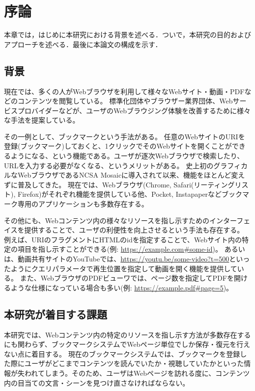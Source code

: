 \chapter{序論}
\label{chap:introduction}

本章では，はじめに本研究における背景を述べる．ついで，本研究の目的およびアプローチを述べる．最後に本論文の構成を示す．

\section{背景}
\label{section:background}

現在では、多くの人がWebブラウザを利用して様々なWebサイト・動画・PDFなどのコンテンツを閲覧している。
標準化団体やブラウザー業界団体、Webサービスプロバイダーなどが、ユーザのWebブラウジング体験を改善するために様々な手法を提案している。

その一例として、ブックマークという手法がある。
任意のWebサイトのURIを登録(ブックマーク)しておくと、1クリックでそのWebサイトを開くことができるようになる、という機能である。ユーザが逐次Webブラウザで検索したり、URLを入力する必要がなくなる、というメリットがある。
史上初のグラフィカルなWebブラウザであるNCSA Mosaic\cite{ncsa-mosaic}に導入されて以来、機能をほとんど変えずに普及してきた。
現在では、Webブラウザ(Chrome\cite{chrome}, Safari\cite{safari}(リーティングリスト), Firefox\cite{firefox})がそれぞれ機能を提供している他、Pocket\cite{pocket}, Instapaper\cite{instapaper}などブックマーク専用のアプリケーションも多数存在する。

その他にも、Webコンテンツ内の様々なリソースを指し示すためのインターフェイスを提供することで、ユーザの利便性を向上させるという手法も存在する。
例えば、URIのフラグメントにHTMLのidを指定することで、Webサイト内の特定の項目を指し示すことができる(例: \url{https://example.com#some-id})。
あるいは、動画共有サイトのYouTube\cite{youtube}では、\url{https://youtu.be/some-video?t=500}といったようにクエリパラメータで再生位置を指定して動画を開く機能を提供している。
また、WebブラウザのPDFビューワでは、ページ数を指定してPDFを開けるような仕様になっている場合も多い\cite{browser-pdf-viewer-pdf-page-num-function}(例: \url{https://example.pdf#page=5})。

\section{本研究が着目する課題}
本研究では、Webコンテンツ内の特定のリソースを指し示す方法が多数存在するにも関わらず、ブックマークシステムでWebページ単位でしか保存・復元を行えない点に着目する。
現在のブックマークシステムでは、ブックマークを登録した際にユーザがどこまでコンテンツを読んでいたか・視聴していたかといった情報が失われてしまう。そのため、ユーザはWebページを訪れる度に、コンテンツ内の目当ての文言・シーンを見つけ直さなければならない。

